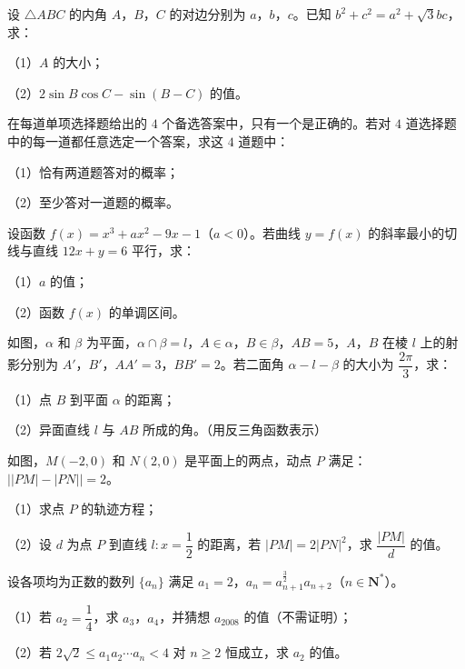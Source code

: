 \begin{question}
设 $\triangle ABC$ 的内角 $A$，$B$，$C$ 的对边分别为 $a$，$b$，$c$。已知 $b^2+c^2=a^2+\sqrt3bc$，求：

（1）$A$ 的大小；

（2）$2\sin B\cos C-\sin(B-C)$ 的值。

\end{question}
\begin{question}
在每道单项选择题给出的 $4$ 个备选答案中，只有一个是正确的。若对 $4$ 道选择题中的每一道都任意选定一个答案，求这 $4$ 道题中：

（1）恰有两道题答对的概率；

（2）至少答对一道题的概率。

\end{question}
\begin{question}
设函数 $f(x)=x^3+ax^2-9x-1$（$a<0$）。若曲线 $y=f(x)$ 的斜率最小的切线与直线 $12x+y=6$ 平行，求：

（1）$a$ 的值；

（2）函数 $f(x)$ 的单调区间。

\Needspace{0.4\textheight}
\end{question}
\begin{question}
如图，$\alpha$ 和 $\beta$ 为平面，$\alpha\cap\beta=l$，$A\in\alpha$，$B\in\beta$，$AB=5$，$A$，$B$ 在棱 $l$ 上的射影分别为 $A'$，$B'$，$AA'=3$，$BB'=2$。若二面角 $\alpha-l-\beta$ 的大小为 $\dfrac{2\pi}3$，求：

（1）点 $B$ 到平面 $\alpha$ 的距离；

（2）异面直线 $l$ 与 $AB$ 所成的角。（用反三角函数表示）
\nopagebreak[4]
\begin{center}\end{center}
\nopagebreak[4]
\Needspace{0.4\textheight}
\end{question}
\begin{question}
如图，$M(-2,0)$ 和 $N(2,0)$ 是平面上的两点，动点 $P$ 满足：$\left||PM|-|PN|\right|=2$。

（1）求点 $P$ 的轨迹方程；

（2）设 $d$ 为点 $P$ 到直线 $l:x=\dfrac12$ 的距离，若 $|PM|=2|PN|^2$，求 $\dfrac{|PM|}d$ 的值。
\nopagebreak[4]
\begin{center}\end{center}
\nopagebreak[4]
\end{question}
\begin{question}
设各项均为正数的数列 $\{a_n\}$ 满足 $a_1=2$，$a_n=a_{n+1}^{\frac32}a_{n+2}$（$n\in\mathbf N^*$）。

（1）若 $a_2=\dfrac14$，求 $a_3$，$a_4$，并猜想 $a_{2008}$ 的值（不需证明）；

（2）若 $2\sqrt2\leqslant a_1a_2\cdots a_n<4$ 对 $n\geqslant2$ 恒成立，求 $a_2$ 的值。

\end{question}